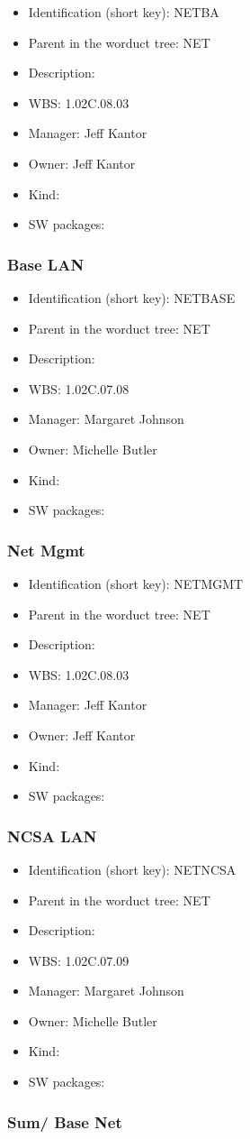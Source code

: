 \begin{itemize}\item Identification (short key): NETBA
\item Parent in the worduct tree: NET
\item Description: 
\item WBS: 1.02C.08.03
\item Manager: Jeff Kantor
\item Owner: Jeff Kantor
\item Kind:
\item SW packages: 
\end{itemize}\subsubsection{Base LAN}
\begin{itemize}\item Identification (short key): NETBASE
\item Parent in the worduct tree: NET
\item Description: 
\item WBS: 1.02C.07.08
\item Manager: Margaret Johnson
\item Owner: Michelle Butler
\item Kind:
\item SW packages: 
\end{itemize}\subsubsection{Net Mgmt}
\begin{itemize}\item Identification (short key): NETMGMT
\item Parent in the worduct tree: NET
\item Description: 
\item WBS: 1.02C.08.03
\item Manager: Jeff Kantor
\item Owner: Jeff Kantor
\item Kind:
\item SW packages: 
\end{itemize}\subsubsection{NCSA LAN}
\begin{itemize}\item Identification (short key): NETNCSA
\item Parent in the worduct tree: NET
\item Description: 
\item WBS: 1.02C.07.09
\item Manager: Margaret Johnson
\item Owner: Michelle Butler
\item Kind:
\item SW packages: 
\end{itemize}\subsubsection{Sum/ Base Net}
